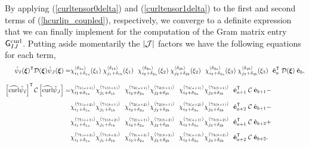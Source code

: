 By applying (\ref{curltensor0delta}) and (\ref{curltensor1delta}) to the first and second terms of (\ref{hcurlip_coupled}), respectively, we converge to a definite expression that we can finally implement for the computation of the Gram matrix entry $\mathsf{G}^{\operatorname{curl}}_{IJ}$. Putting aside momentarily the $|\mathcal{J}|$ factors we have the following equations for each term,
%
\begin{align}
    \hat{\psi}_I(\bsxi)^\T\mcD(\bsxi)\hat{\psi}_J(\bsxi)=&
    \chi_{i_1+\delta_{1a}}^{\langle\delta_{1a}\rangle}(\xi_1)\; \chi_{j_1+\delta_{1b}}^{\langle\delta_{1b}\rangle}(\xi_1)\ \  \chi_{i_2+\delta_{2a}}^{\langle\delta_{2a}\rangle}(\xi_2)\; \chi_{j_2+\delta_{2b}}^{\langle\delta_{2b}\rangle}(\xi_2)\ \  \chi_{i_3+\delta_{3a}}^{\langle\delta_{3a}\rangle}(\xi_3)\; \chi_{j_3+\delta_{3b}}^{\langle\delta_{3b}\rangle}(\xi_3)\ \ 
    \hat{\bfe}_a^\T\; \mcD(\bsxi)\; \hat{\bfe}_b,
    \label{hcurlip_decoupled0}\\[8pt]
    \left[\widehat{\curl}\hat{\psi}_I\right]^\T\mcC\left[\widehat{\curl}\hat{\psi}_J\right]=&     
    \chi_{i_1+\delta_{1a}}^{\langle\gamma_{1(a+1)}\rangle} \chi_{j_1+\delta_{1b}}^{\langle\gamma_{1(b+1)}\rangle}\ \   \chi_{i_2+\delta_{2a}}^{\langle\gamma_{2(a+1)}\rangle} \chi_{j_2+\delta_{2b}}^{\langle\gamma_{2(b+1)}\rangle}\ \   \chi_{i_3+\delta_{3a}}^{\langle\gamma_{3(a+1)}\rangle} \chi_{j_3+\delta_{3b}}^{\langle\gamma_{3(b+1)}\rangle}\ \ 
    \hat{\bfe}_{a+1}^\T\;\mcC\;\hat{\bfe}_{b+1}-\nonumber\\[4pt] &
    \chi_{i_1+\delta_{1a}}^{\langle\gamma_{1(a+2)}\rangle} \chi_{j_1+\delta_{1b}}^{\langle\gamma_{1(b+1)}\rangle}\ \   \chi_{i_2+\delta_{2a}}^{\langle\gamma_{2(a+2)}\rangle} \chi_{j_2+\delta_{2b}}^{\langle\gamma_{2(b+1)}\rangle}\ \   \chi_{i_3+\delta_{3a}}^{\langle\gamma_{3(a+2)}\rangle} \chi_{j_3+\delta_{3b}}^{\langle\gamma_{3(b+1)}\rangle}\ \ 
    \hat{\bfe}_{a+2}^\T\;\mcC\;\hat{\bfe}_{b+1}-\nonumber\\[4pt] &
    \chi_{i_1+\delta_{1a}}^{\langle\gamma_{1(a+1)}\rangle} \chi_{j_1+\delta_{1b}}^{\langle\gamma_{1(b+2)}\rangle}\ \   \chi_{i_2+\delta_{2a}}^{\langle\gamma_{2(a+1)}\rangle} \chi_{j_2+\delta_{2b}}^{\langle\gamma_{2(b+2)}\rangle}\ \   \chi_{i_3+\delta_{3a}}^{\langle\gamma_{3(a+1)}\rangle} \chi_{j_3+\delta_{3b}}^{\langle\gamma_{3(b+2)}\rangle}\ \ 
    \hat{\bfe}_{a+1}^\T\;\mcC\;\hat{\bfe}_{b+2}+\nonumber\\[4pt] &
    \chi_{i_1+\delta_{1a}}^{\langle\gamma_{1(a+2)}\rangle} \chi_{j_1+\delta_{1b}}^{\langle\gamma_{1(b+2)}\rangle}\ \  \chi_{i_2+\delta_{2a}}^{\langle\gamma_{2(a+2)}\rangle} \chi_{j_2+\delta_{2b}}^{\langle\gamma_{2(b+2)}\rangle}\ \  \chi_{i_3+\delta_{3a}}^{\langle\gamma_{3(a+2)}\rangle} \chi_{j_3+\delta_{3b}}^{\langle\gamma_{3(b+2)}\rangle}\ \ 
    \hat{\bfe}_{a+2}^\T\;\mcC\;\hat{\bfe}_{b+2}.
    \label{hcurlip_decoupled1}    
\end{align}

